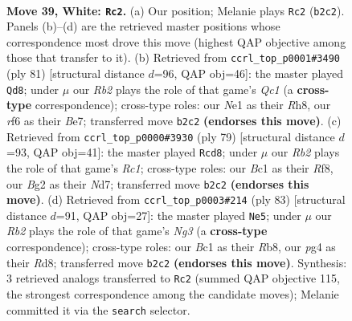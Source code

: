 \documentclass[11pt]{article}
\begin{document}
\begin{figure}[p]\centering
\begin{subfigure}{0.46\textwidth}\centering
\resizebox{\linewidth}{!}{%
\newchessgame
\chessboard[
  setfen={n1r3k1/pb1qb1n1/5r2/P1p2p1p/3p1Pp1/1P4P1/1R2P1BP/RQBNN1K1 w - - 10 39},
  showmover=false,
  pgfstyle=straightmove, color=movearrow, markmove={b2-c2}
]}
\caption{}
\end{subfigure}\hfill
\begin{subfigure}{0.46\textwidth}\centering
\resizebox{\linewidth}{!}{%
\newchessgame
\chessboard[
  setfen={2q4r/p1r1bpk1/1pbp2p1/4p2p/P1P1P3/1PNR1B1P/3Q1PP1/4R1K1 b - - 24 41},
  showmover=false,
  pgfstyle=straightmove, color=movearrow, markmove={c8-d8}
]}
\caption{}
\end{subfigure}
\\[4pt]
\begin{subfigure}{0.46\textwidth}\centering
\resizebox{\linewidth}{!}{%
\newchessgame
\chessboard[
  setfen={2r2r2/2qnbp1k/p1bpp1pp/P3P3/3B1P2/1NN4P/1PP2QP1/3RR1K1 b - - 16 40},
  showmover=false,
  pgfstyle=straightmove, color=movearrow, markmove={c8-d8}
]}
\caption{}
\end{subfigure}\hfill
\begin{subfigure}{0.46\textwidth}\centering
\resizebox{\linewidth}{!}{%
\newchessgame
\chessboard[
  setfen={1r1r2k1/2qbbp2/pp1pp1np/8/1PPBPp2/N2B1P1P/P3Q1P1/3R1R1K b - - 0 42},
  showmover=false,
  pgfstyle=straightmove, color=movearrow, markmove={g6-e5}
]}
\caption{}
\end{subfigure}
\caption{\textbf{Move 39, White: \texttt{Rc2}.} (a) Our position; Melanie plays \texttt{Rc2} (\texttt{b2c2}). Panels (b)--(d) are the retrieved master positions whose correspondence most drove this move (highest QAP objective among those that transfer to it). (b) Retrieved from \texttt{ccrl\_top\_p0001\#3490} (ply 81) [structural distance $d$=96, QAP obj=46]: the master played \texttt{Qd8}; under $\mu$ our \emph{Rb2} plays the role of that game's \emph{Qc1} (a \textbf{cross-type} correspondence); cross-type roles: our \emph{N}e1 as their \emph{R}h8, our \emph{r}f6 as their \emph{B}e7; transferred move \texttt{b2c2} \textbf{(endorses this move)}. (c) Retrieved from \texttt{ccrl\_top\_p0000\#3930} (ply 79) [structural distance $d$=93, QAP obj=41]: the master played \texttt{Rcd8}; under $\mu$ our \emph{Rb2} plays the role of that game's \emph{Rc1}; cross-type roles: our \emph{B}c1 as their \emph{R}f8, our \emph{B}g2 as their \emph{N}d7; transferred move \texttt{b2c2} \textbf{(endorses this move)}. (d) Retrieved from \texttt{ccrl\_top\_p0003\#214} (ply 83) [structural distance $d$=91, QAP obj=27]: the master played \texttt{Ne5}; under $\mu$ our \emph{Rb2} plays the role of that game's \emph{Ng3} (a \textbf{cross-type} correspondence); cross-type roles: our \emph{B}c1 as their \emph{R}b8, our \emph{p}g4 as their \emph{R}d8; transferred move \texttt{b2c2} \textbf{(endorses this move)}. Synthesis: 3 retrieved analogs transferred to \texttt{Rc2} (summed QAP objective 115, the strongest correspondence among the candidate moves); Melanie committed it via the \texttt{search} selector.}
\label{fig:thought-m76}
\end{figure}
\end{document}
